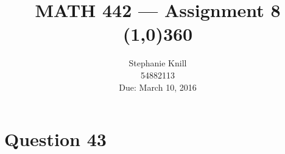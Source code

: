 \documentclass[11pt, oneside]{article}   	%
\begin{document}
\title{MATH 442 --- Assignment 8 \\
\line(1,0){360} \\              %
}
\author{
Stephanie Knill \\
54882113 \\
Due: March 10, 2016}

\date{}                   %
\maketitle




\section*{Question 43}
\end{document}
